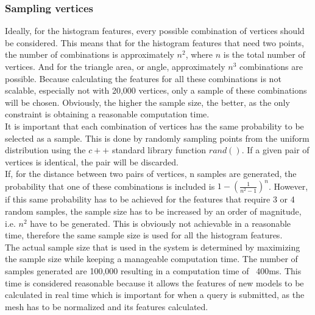 \documentclass{bigdata}
\begin{document}
\subsubsection{Sampling vertices}
Ideally, for the histogram features, every possible combination of vertices should be considered. This means that for the histogram features that need two points, the number of combinations is approximately $n^2$, where $n$ is the total number of vertices. And for the triangle area, or angle, approximately $n^3$ combinations are possible. Because calculating the features for all these combinations is not scalable, especially not with 20,000 vertices, only a sample of these combinations will be chosen. Obviously, the higher the sample size, the better, as the only constraint is obtaining a reasonable computation time.\\
It is important that each combination of vertices has the same probability to be selected as a sample. This is done by randomly sampling points from the uniform distribution using the $c++$ standard library function $rand()$. If a given pair of vertices is identical, the pair will be discarded. \\
If, for the distance between two pairs of vertices, n samples are generated, the probability that one of these combinations is included is $1-(\frac{1}{n^2 - 1})^{n}$. However, if this same probability has to be achieved for the features that require 3 or 4 random samples, the sample size has to be increased by an order of magnitude, i.e. $n^2$ have to be generated. This is obviously not achievable in a reasonable time, therefore the same sample size is used for all the histogram features. \\
The actual sample size that is used in the system is determined by maximizing the sample size while keeping a manageable computation time. The number of samples generated are 100,000 resulting in a computation time of ~400ms. This time is considered reasonable because it allows the features of new models to be calculated in real time which is important for when a query is submitted, as the mesh has to be normalized and its features calculated.
\end{document}
